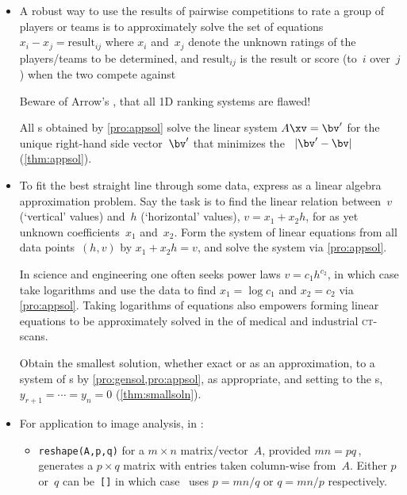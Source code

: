\begin{itemize}
\item A robust way to use the results of pairwise competitions to rate a group of players or teams is to approximately solve the set of equations \(x_i-x_j=\text{result}_{ij}\) where \(x_i\) and~\(x_j\) denote the unknown ratings of the players\slash teams to be determined, and \(\text{result}_{ij}\) is the result or score (to~\(i\) over~\(j\)) when the two compete against 

Beware of Arrow's , that all 1D ranking systems are flawed!

\itemme All s obtained by \cref{pro:appsol} solve the linear system \(A\xv=\bv'\) for the unique  right-hand side vector~\(\bv'\) that minimizes the ~\(|\bv'-\bv|\) (\cref{thm:appsol}).

\item To fit the best straight line through some data, express as a linear algebra approximation problem.
Say the task is to find the linear relation between~\(v\) (`vertical' values) and~\(h\) (`horizontal' values), \(v=x_1+x_2h\), for as yet unknown coefficients~\(x_1\) and~\(x_2\).
Form the system of linear equations from all data points~\((h,v)\) by \(x_1+x_2h=v\), and solve the system via \cref{pro:appsol}.

In science and engineering one often seeks power laws \(v=c_1h^{c_2}\), in which case take logarithms and use the data to find \(x_1=\log c_1\) and \(x_2=c_2\) via \cref{pro:appsol}.
Taking logarithms of equations also empowers forming linear equations to be approximately solved in the  of medical and industrial \textsc{ct}-scans.


\itemhi Obtain the {smallest solution}, whether exact or as an approximation, to a system of s by \cref{pro:gensol,pro:appsol}, as appropriate, and setting to  the s, \(y_{r+1}=\cdots=y_n=0\) (\cref{thm:smallsoln}).

\item For application to image analysis, in \script:
\begin{itemize}

\item {}\verb|reshape(A,p,q)| for a \(m\times n\) matrix\slash vector~\(A\), provided \(mn=pq\)\,, generates a \(p\times q\) matrix with entries taken column-wise from~\(A\).  
Either \(p\) or~\(q\) can be~\verb|[]| in which case \script\ uses \(p=mn/q\) or \(q=mn/p\) respectively.


\end{itemize}
\end{itemize}
